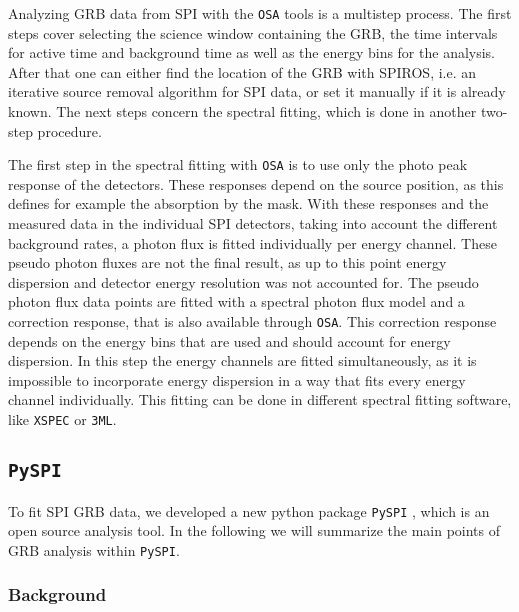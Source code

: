 \documentclass[twocolumn,traditabstract]{aa}
\begin{document}
Analyzing GRB data from SPI with the {\tt OSA} tools is a multistep process. The first steps cover selecting the science window containing the GRB, the time intervals for active time and background time as well as the energy bins for the analysis. After that one can either find the location of the GRB with SPIROS, i.e. an iterative source removal algorithm for SPI data, or set it manually if it is already known. The next steps concern the spectral fitting, which is done in another two-step procedure.

The first step in the spectral fitting with {\tt OSA} is to use only the photo peak response of the detectors. These responses depend on the source position, as this defines for example the absorption by the mask. With these responses and the measured data in the individual SPI detectors, taking into account the different background rates, a photon flux is fitted individually per energy channel. These pseudo photon fluxes are not the final result, as up to this point energy dispersion and detector energy resolution was not accounted for.
The pseudo photon flux data points are fitted with a spectral photon flux model and a correction response, that is also available through {\tt OSA}. This correction response depends on the energy bins that are used and should account for energy dispersion. In this step the energy channels are fitted simultaneously, as it is impossible to incorporate energy dispersion in a way that fits every energy channel individually. This fitting can be done in different spectral fitting software, like {\tt XSPEC} or {\tt 3ML}.


\subsection{{\tt PySPI}}
\label{pyspi}
To fit SPI GRB data, we developed a new python package {\tt PySPI} \citep{joss}, which is an open source analysis tool. In the following we will summarize the main points of GRB analysis within {\tt PySPI}.

\subsubsection{Background}
\end{document}
